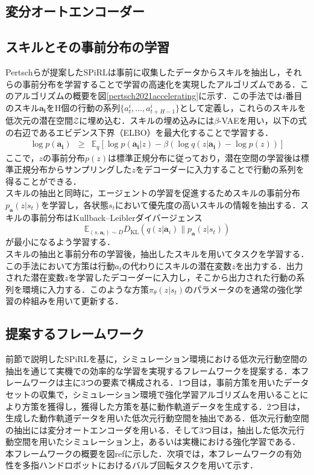 \documentclass[dvipdfmx]{ampbt_nomag}
\begin{document}
\subsection{変分オートエンコーダー}


\subsection{スキルとその事前分布の学習}
Pertschらが提案したSPiRLは事前に収集したデータからスキルを抽出し，それらの事前分布を学習することで学習の高速化を実現したアルゴリズムである\cite{pertsch2021accelerating}．このアルゴリズムの概要を図\ref{pertsch2021accelerating}に示す．この手法では$i$番目のスキル$\boldsymbol{a_i}$をH個の行動の系列$\{a^i_t,...,a^i_{t+H-1}\}$として定義し，これらのスキルを低次元の潜在空間$\mathcal{Z}$に埋め込む．スキルの埋め込みには$\beta$-VAEを用い，以下の式の右辺であるエビデンス下界（ELBO）を最大化することで学習する．
\begin{eqnarray} 
\label{ELBO}
\log p(\boldsymbol{a_i}) &\geq& \mathbb{E}_q [\log p(\boldsymbol{a_i}|z)  -\beta(\log{q(z|\boldsymbol{a_i})} - \log{p(z)})]
\end{eqnarray}
ここで，$z$の事前分布$p(z)$は標準正規分布に従っており，潜在空間の学習後は標準正規分布からサンプリングした$z$をデコーダーに入力することで行動の系列を得ることができる．\\
スキルの抽出と同時に，エージェントの学習を促進するためスキルの事前分布$p_{\boldsymbol{a}}(z|s_t)$を学習し，各状態$s_t$において優先度の高いスキルの情報を抽出する．スキルの事前分布はKullback--Leiblerダイバージェンス
\begin{equation}
  \mathbb{E}_{(s,\boldsymbol{a}_i)\sim D}D_\mathrm{KL}\left(q(z|\boldsymbol{a}_i)\|p_{\boldsymbol{a}}(z|s_t)\right)
\end{equation}
が最小になるよう学習する．\\
スキルの抽出と事前分布の学習後，抽出したスキルを用いてタスクを学習する．この手法において方策は行動$a_t$の代わりにスキルの潜在変数$z$を出力する．出力された潜在変数$z$を学習したデコーダーに入力し，そこから出力された行動の系列を環境に入力する．このような方策$\pi_\theta(z|s_t)$のパラメータのを通常の強化学習の枠組みを用いて更新する．

\subsection{提案するフレームワーク}
前節で説明したSPiRLを基に，シミュレーション環境における低次元行動空間の抽出を通じて実機での効率的な学習を実現するフレームワークを提案する．本フレームワークは主に3つの要素で構成される．1つ目は，事前方策を用いたデータセットの収集で，シミュレーション環境で強化学習アルゴリズムを用いることにより方策を獲得し，獲得した方策を基に動作軌道データを生成する．2つ目は，生成した動作軌道データを用いた低次元行動空間を抽出である．低次元行動空間の抽出には変分オートエンコーダを用いる．そして3つ目は，抽出した低次元行動空間を用いたシミュレーション上，あるいは実機における強化学習である．\\
本フレームワークの概要を図ref{}に示した．次項では，本フレームワークの有効性を多指ハンドロボットにおけるバルブ回転タスクを用いて示す．
\end{document}
